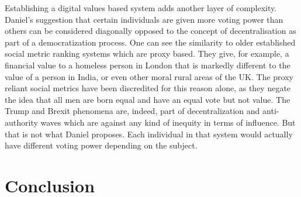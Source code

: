 \documentclass[twoside,twocolumn]{article}
\begin{document}
Establishing a digital values based system adds another layer of complexity.
Daniel’s\cite{DanielDAGS2016} suggestion that certain individuals are given more
voting power than others can be considered diagonally opposed to the concept of
decentralisation as part of a democratization process. One can see the
similarity to older established social metric ranking systems which are proxy
based. They give, for example, a financial value to a homeless person in London
that is markedly different to the value of a person in India, or even other
moral rural areas of the UK. The proxy reliant social metrics have been
discredited for this reason alone, as they negate the idea that all men are born
equal and have an equal vote but not value. The Trump and Brexit phenomena are,
indeed, part of decentralization and anti-authority waves which are against any
kind of inequity in terms of influence. But that is not what Daniel proposes.
Each individual in that system would actually have different voting power
depending on the subject.


\section{Conclusion}

\Blindtext




\end{document}
